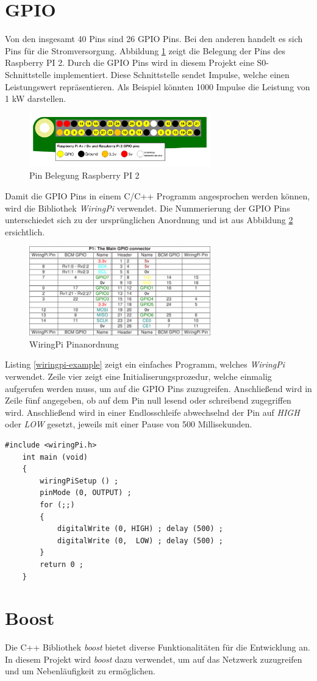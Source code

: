 \section{GPIO}
Von den insgesamt 40 Pins sind 26 GPIO Pins. Bei den anderen handelt es sich Pins für die Stromversorgung. Abbildung \ref{gpio-pins} zeigt die Belegung der Pins des Raspberry PI 2. Durch die GPIO Pins wird in diesem Projekt eine S0-Schnittstelle implementiert. Diese Schnittstelle sendet Impulse, welche einen Leistungswert repräsentieren. Als Beispiel könnten 1000 Impulse die Leistung von 1 kW darstellen.
\begin{figure}[H]
	\centering
	\includegraphics[width=0.7\textwidth]{bilder/gpio-pins.png}
	\caption{Pin Belegung Raspberry PI 2}
	\label{gpio-pins}
\end{figure}
\noindent
Damit die GPIO Pins in einem C/C++ Programm angesprochen werden können, wird die Bibliothek \textit{WiringPi} verwendet. %
Die Nummerierung der GPIO Pins unterschiedet sich zu der ursprünglichen Anordnung und ist aus Abbildung \ref{wiringpi} ersichtlich.
 \begin{figure}[H]
 	\centering
 	\includegraphics[width=0.7\textwidth]{bilder/wiringpi.png}
 	\caption{WiringPi Pinanordnung}
 	\label{wiringpi}
 \end{figure}
\noindent
Listing \ref{wiringpi-example} zeigt ein einfaches Programm, welches \textit{WiringPi} verwendet. Zeile vier zeigt eine Initialiserungsprozedur, welche einmalig aufgerufen werden muss, um auf die GPIO Pins zuzugreifen. Anschließend wird in Zeile fünf angegeben, ob auf dem Pin null lesend oder schreibend zugegriffen wird. Anschließend wird in einer Endlosschleife abwechselnd der Pin auf \textit{HIGH} oder \textit{LOW} gesetzt, jeweils mit einer Pause von 500 Millisekunden.
\begin{lstlisting}[frame=single, basicstyle=\tiny, caption=WiringPi Beispiel, label=wiringpi-example]
	#include <wiringPi.h>
	int main (void)
	{
		wiringPiSetup () ;
		pinMode (0, OUTPUT) ;
		for (;;)
		{
			digitalWrite (0, HIGH) ; delay (500) ;
			digitalWrite (0,  LOW) ; delay (500) ;
		}
		return 0 ;
	}
\end{lstlisting}
\section{Boost}
Die C++ Bibliothek \textit{boost} bietet diverse Funktionalitäten für die Entwicklung an. In diesem Projekt wird \textit{boost} dazu verwendet, um auf das Netzwerk zuzugreifen und um Nebenläufigkeit zu ermöglichen. 
